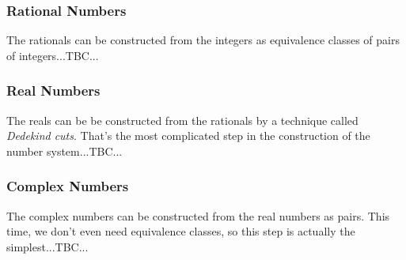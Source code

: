\subsubsection{Rational Numbers} The rationals can be constructed from the integers as equivalence classes of pairs of integers...TBC...

\subsubsection{Real Numbers} The reals can be be constructed from the rationals by a technique called \emph{Dedekind cuts}. That's the most complicated step in the construction of the number system...TBC...

\subsubsection{Complex Numbers} The complex numbers can be constructed from the real numbers as pairs. This time, we don't even need equivalence classes, so this step is actually the simplest...TBC...








